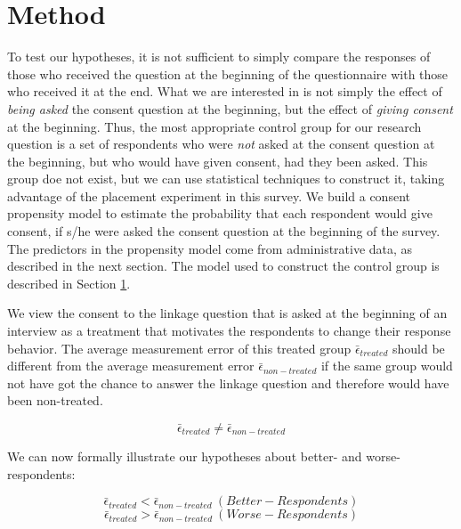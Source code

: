 \section{Method}\label{method}

To test our hypotheses, it is not sufficient to simply compare the responses of those who received the question at the beginning of the questionnaire with those who received it at the end. What we are interested in is not simply the effect of \textit{being asked} the consent question at the beginning, but the effect of \textit{giving consent} at the beginning. Thus, the most appropriate control group for our research question is a set of respondents who were \textit{not} asked at the consent question at the beginning, but who would have given consent, had they been asked. This group doe not exist, but we can use statistical techniques to construct it, taking advantage of the placement experiment in this survey. We build a consent propensity model to estimate the probability that each respondent would give consent, if s/he were asked the consent question at the beginning of the survey. The predictors in the propensity model come from administrative data, as described in the next section. The model used to construct the control group is described in Section \ref{method}. 


We view the consent to the linkage question that is asked at the beginning of an interview as a treatment that motivates the respondents to change their response behavior. The average measurement error of this treated group \(\bar{\epsilon}_{treated}\) should be different from the average measurement error \(\bar{\epsilon}_{non-treated}\) if the same group would not have got the chance to answer the linkage question and therefore would have been non-treated.

\begin{equation}
\bar{\epsilon}_{treated} \neq \bar{\epsilon}_{non-treated}
\label{eq:hyp_epsi}
\end{equation}

We can now formally illustrate our hypotheses about better- and worse-respondents:

\begin{equation}
\bar{\epsilon}_{treated} < \bar{\epsilon}_{non-treated} \ (Better-Respondents)
\label{eq:hyp_better}
\end{equation}
\begin{equation}
\bar{\epsilon}_{treated} > \bar{\epsilon}_{non-treated}  \ (Worse-Respondents)
\label{eq:hyp_worse}
\end{equation}

